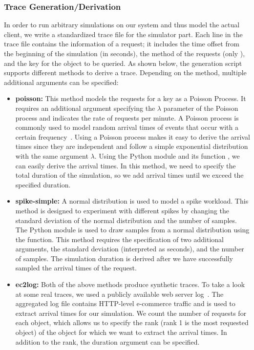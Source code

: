 \subsubsection{Trace Generation/Derivation}
In order to run arbitrary simulations on our system and thus model the actual client, we write a standardized trace file for the simulator part. Each line in the trace file contains the information of a request; it includes the time offset from the beginning of the simulation (in seconds), the method of the requests (only ), and the key for the object to be queried. As shown below, the generation script supports different methods to derive a trace. Depending on the method, multiple additional arguments can be specified:
\begin{itemize}
    \item \textbf{poisson:} This method models the requests for a key as a Poisson Process. It requires an additional argument specifying the $\lambda$ parameter of the Poisson process and indicates the rate of requests per minute. A Poisson process is commonly used to model random arrival times of events that occur with a certain frequency~\cite{noauthor_basic_nodate}. Using a Poisson process makes it easy to derive the arrival times since they are independent and follow a simple exponential distribution with the same argument $\lambda$. Using the Python module  and its function , we can easily derive the arrival times. In this method, we need to specify the total duration of the simulation, so we add arrival times until we exceed the specified duration.
    \item \textbf{spike-simple:} A normal distribution is used to model a spike workload. This method is designed to experiment with different spikes by changing the standard deviation of the normal distribution and the number of samples. The Python module  is used to draw samples from a normal distribution using the  function. This method requires the specification of two additional arguments, the standard deviation (interpreted as seconds), and the number of samples. The simulation duration is derived after we have successfully sampled the arrival times of the request.
    \item \textbf{ec2log:} Both of the above methods produce synthetic traces. To take a look at some real traces, we used a publicly available web server log~\cite{chodak_http-level_2020}. The aggregated log file contains HTTP-level e-commerce traffic and is used to extract arrival times for our simulation. We count the number of  requests for each object, which allows us to specify the rank (rank 1 is the most requested object) of the object for which we want to extract the arrival times. In addition to the rank, the duration argument can be specified.
\end{itemize}

